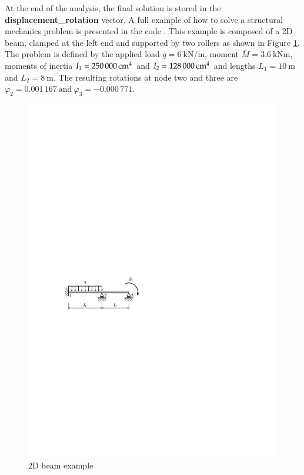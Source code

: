 At the end of the analysis, the final solution is stored in the
\textbf{displacement\_rotation} vector.  A full example of how to
solve a structural mechanics problem is presented in the code
.
This example is composed of a 2D beam, clamped at the left end and
supported by two rollers as shown in Figure
\ref{fig:structMechMod:exem1_1}.  The problem is defined by the
applied load $q=\SI{6}{\kilo\newton\per\metre}$, moment $\bar{M} =
\SI{3.6}{\kilo\newton\metre}$, moments of inertia $I_1 =
\SI{250\,000}{\centi\metre\tothe{4}}$ and $I_2 =
\SI{128\,000}{\centi\metre\tothe{4}}$ and lengths $L_1 =
\SI{10}{\metre}$ and $L_2 = \SI{8}{\metre}$.  The resulting
rotations at node two and three are $ \varphi_2 = 0.001\,167\
\mbox{and}\ \varphi_3 = -0.000\,771.$

 \begin{figure}[htb]
   \centering
   \includegraphics[scale=1.1]{figures/beam_example}
   \caption{2D beam example}
   \label{fig:structMechMod:exem1_1}
 \end{figure}





